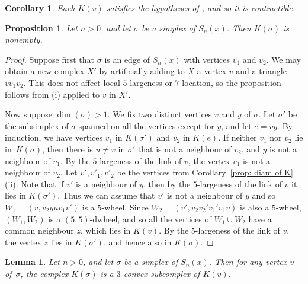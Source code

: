 \documentclass[a4paper,12pt,leqno]{amsart}
\newtheorem{prop}[thm]{Proposition}
\newtheorem{lemma}[thm]{Lemma}
\newtheorem{cor}[thm]{Corollary}
\theoremstyle{definition}
\begin{document}
\begin{cor} \label{prop:vertex link contractible}
    Each $K(v)$ satisfies the hypotheses of , and so it is contractible.
\end{cor}





\begin{prop}
\label{prop:nonempty}
   Let $n > 0$, and let $\sigma$ be a simplex of $S_n(x)$. Then $K(\sigma)$ is nonempty.
\end{prop}

\begin{proof}
    Suppose first that $\sigma$ is an edge of $S_n(x)$ with vertices $v_1$ and $v_2$. We may obtain a new complex $X'$ by artificially adding to $X$ a vertex $v$ and a triangle $vv_1v_2$.
    This does not affect local $5$-largeness or $7$-location, so the proposition follows from (i) applied to $v$ in $X'$.

    Now suppose $\dim(\sigma) > 1$. We fix two distinct vertices $v$ and $y$ of $\sigma$. Let $\sigma'$ be the subsimplex of $\sigma$ spanned on all the vertices except for $y$, and let $e=vy$.
    By induction, 
    we have vertices $v_1$ in $K(\sigma')$ and $v_2$ in $K(e)$.
    If neither $v_1$ nor $v_2$ lie in~$K(\sigma)$, then there is $u\neq v$ in $\sigma'$ that is not a neighbour of $v_2$, and $y$ is not a neighbour of $v_1$. By the $5$-largeness of the link of $v$, the vertex $v_1$ is not a neighbour of $v_2$. Let $v',v'_1,v'_2$ be the vertices from Corollary~\ref{prop: diam of K}(ii). Note that if $v'$ is a neighbour of $y$, then by the $5$-largeness of the link of $v$ it lies in $K(\sigma')$. Thus we can assume that $v'$ is not a neighbour of $y$ and so $W_1=(v, v_2yuv_1v')$ is a $5$-wheel. Since $W_2=(v',v_2v_2'v_1'v_1v)$ is also a $5$-wheel, $(W_1,W_2)$ 
    is a $(5,5)$-dwheel, and so all the vertices of $W_1\cup W_2$ have a common neighbour $z$, which lies in $K(v)$. By the $5$-largeness of the link of $v$, the vertex $z$ lies in $K(\sigma')$, and hence also in $K(\sigma)$.
\end{proof}
    


\begin{lemma} \label{prop:downward link of simplex is contractible}
   Let $n > 0$, and let $\sigma$ be a simplex of $S_n(x)$. Then for any vertex $v$ of~$\sigma$, the complex $K(\sigma)$ is a $3$-convex subcomplex of $K(v)$.
\end{lemma}
\end{document}
